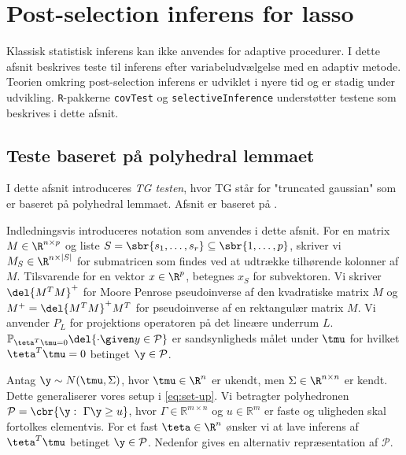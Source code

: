 \section{Post-selection inferens for lasso}
Klassisk statistisk inferens kan ikke anvendes for adaptive procedurer.
I dette afsnit beskrives teste til inferens efter variabeludvælgelse med en adaptiv metode.
Teorien omkring post-selection inferens er udviklet i nyere tid og er stadig under udvikling.
\texttt{R}-pakkerne \texttt{covTest} og \texttt{selectiveInference} understøtter testene som beskrives i dette afsnit.



\subsection{Teste baseret på polyhedral lemmaet}
I dette afsnit introduceres \textit{TG testen}, hvor TG står for "truncated gaussian" som er baseret på polyhedral lemmaet. 
Afsnit er baseret på \citep{post_inference}.

Indledningsvis introduceres notation som anvendes i dette afsnit.
For en matrix \(M \in \R^{n \times p}\) og liste \(S = \sbr{s_1, \ldots, s_r} \subseteq \sbr{1, \ldots, p}\), skriver vi \(M_S \in \R^{n \times \vert S \vert}\) for submatricen som findes ved at udtrække tilhørende kolonner af \(M\).
Tilsvarende for en vektor \(x \in \R^p\), betegnes \(x_S\) for subvektoren.
Vi skriver \(\del{M^T M}^+\) for Moore Penrose pseudoinverse af den kvadratiske matrix \(M\) og \(M^+ = \del{M^T M}^+ M^T\) for pseudoinverse af en rektangulær matrix \(M\).
Vi anvender \(P_L\) for projektions operatoren på det lineære underrum \(L\).
\(\mathbb{P}_{\teta^T \tmu = 0} \del{\cdot \given y \in \mathcal{P}} \) er sandsynligheds målet under \(\tmu\) for hvilket \(\teta^T \tmu =0 \) betinget \(\y \in \mathcal{P}\). 

Antag \(\y \sim N(\tmu, \Sigma)\), hvor \(\tmu \in \R^{n}\) er ukendt, men \(\Sigma \in \R^{n \times n}\) er kendt.
Dette generaliserer vores setup i \eqref{eq:set-up}.
Vi betragter polyhedronen \(\mathcal{P} = \cbr{\y : \ \Gamma \y \geq u}\), hvor \(\Gamma \in \mathbb{R}^{m \times n}\) og \(u \in \mathbb{R}^m\) er faste og uligheden skal fortolkes elementvis.
For et fast \(\teta \in \R^n\) ønsker vi at lave inferens af \(\teta^T \tmu\) betinget \(\y \in \mathcal{P}\).
Nedenfor gives en alternativ repræsentation af \(\mathcal{P}\).



